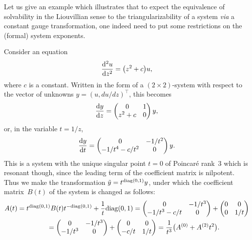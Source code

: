 \documentclass[pdftex]{sigma}
\numberwithin{equation}{section}
\begin{document}
\begin{Example}\label{example1}Let us give an example which illustrates that to expect the equivalence of solvability in the Liouvillian sense to the triangularizability of a system {\it via} a constant gauge transformation, one indeed need to put some restrictions on the (formal) system exponents.

Consider an equation
\begin{gather*}
\frac{{\rm d}^2u}{{\rm d}z^2}=\big(z^2+c\big)u,
\end{gather*}
where $c$ is a constant. Written in the form of a $(2\times2)$-system with respect to the vector of unknowns $y=(u,du/dz)^{\top}$, this becomes
\begin{gather*}
\frac{{\rm d}y}{{\rm d}z}=\left(\begin{matrix} 0 & 1 \\
 z^2+c & 0
 \end{matrix}\right)y,
\end{gather*}
or, in the variable $t=1/z$,
\begin{gather*}
\frac{{\rm d}y}{{\rm d}t}=\left(\begin{matrix} 0 & -1/t^2 \\
 -1/t^4-c/t^2 & 0
 \end{matrix}\right)y.
\end{gather*}
This is a system with the unique singular point $t=0$ of Poincar\'e rank~$3$ which is resonant though, since the leading term of the coefficient matrix is nilpotent. Thus we make the transformation $\tilde y=t^{{\rm diag}(0,1)}y$, under which the coefficient matrix~$B(t)$ of the system is changed as follows:
\begin{gather*}
A(t)=t^{{\rm diag}(0,1)}B(t) t^{-{\rm diag}(0,1)}+\frac1t {\rm diag}(0,1)=
\left(\begin{matrix} 0 & -1/t^3 \\
-1/t^3-c/t & 0
 \end{matrix}\right)+\left(\begin{matrix} 0 & 0 \\
 0 & 1/t
\end{matrix}\right) \\
\hphantom{A(t)}{} =\left(\begin{matrix} 0 & -1/t^3 \\
 -1/t^3 & 0
\end{matrix}\right)+\left(\begin{matrix} 0 & 0 \\
-c/t & 1/t
\end{matrix}\right)=\frac1{t^3}\big(A^{(0)}+A^{(2)}t^2\big).

\end{gather*}
\end{Example}
\end{document}
